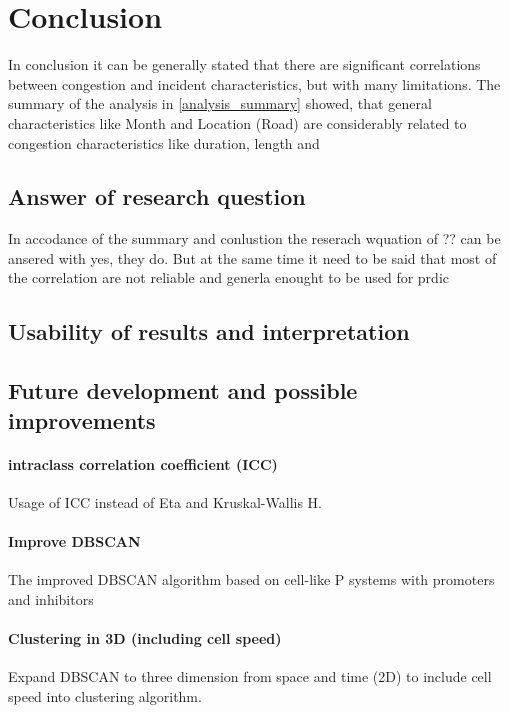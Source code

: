 \chapter{Conclusion}
In conclusion it can be generally stated that there are significant correlations between congestion and incident characteristics, but with many limitations. The summary of the analysis in \cref{analysis_summary} showed, that general characteristics like Month and Location (Road) are considerably related to congestion characteristics like duration, length and 

\section{Answer of research question}

In accodance of the summary and conlustion the reserach wquation of ?? can be ansered with yes, they do. But at the same time it need to be said that most of the correlation are not reliable and generla enought to be used for prdic

\section{Usability of results and interpretation}


\section{Future development and possible improvements} 


\subsubsection{intraclass correlation coefficient (ICC)}
Usage of ICC instead of Eta and Kruskal-Wallis H.

\subsubsection{Improve DBSCAN}
The improved DBSCAN algorithm based on cell-like P systems with promoters and inhibitors

\subsubsection{Clustering in 3D (including cell speed)}
Expand DBSCAN to three dimension from space and time (2D) to include cell speed into clustering algorithm.